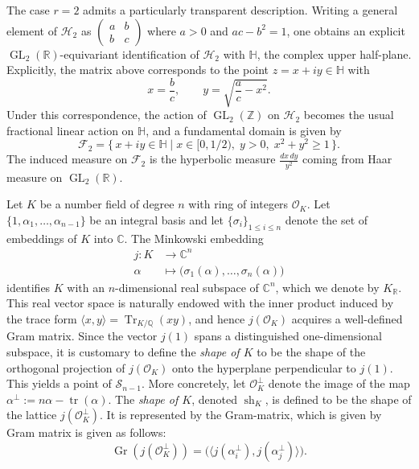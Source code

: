 \documentclass[table]{amsart}
\newcommand{\cO}{\mathcal{O}}
\newcommand{\op}[1]{\operatorname{#1}}
\numberwithin{equation}{section}
\begin{document}
\par The case $r=2$ admits a particularly transparent description. Writing a general element of $\mathcal{H}_2$ as $\begin{pmatrix} a & b \\ b & c \end{pmatrix}$ where $a>0$ and $ac-b^2=1$, one obtains an explicit $\op{GL}_2(\mathbb{R})$-equivariant identification of $\mathcal{H}_2$ with $\mathbb{H}$, the complex upper half-plane. Explicitly, the matrix above corresponds to the point $z=x+iy\in\mathbb{H}$ with
\[
x=\frac{b}{c}, \qquad y=\sqrt{\frac{a}{c}-x^2}.
\]
Under this correspondence, the action of $\op{GL}_2(\mathbb{Z})$ on $\mathcal{H}_2$ becomes the usual fractional linear action on $\mathbb{H}$, and a fundamental domain is given by
\[
\mathcal{F}_2=\{\, x+iy\in\mathbb{H} \mid x\in[0,1/2),\; y>0,\; x^2+y^2\ge 1 \,\}.
\]
The induced measure on $\mathcal{F}_2$ is the hyperbolic measure $\frac{dx\, dy}{y^2}$ coming from Haar measure on $\op{GL}_2(\mathbb{R})$.
\par Let $K$ be a number field of degree $n$ with ring of integers $\mathcal{O}_K$. Let $ \{1, \alpha_1, \dots, \alpha_{n-1}\} $ be an integral basis and let $ \{\sigma_i\}_{1 \leq i \leq n} $ denote the set of embeddings of $ K $ into $ \mathbb{C}$.  The Minkowski embedding  
\[
\begin{aligned}
    j: K &\to \mathbb{C}^{n} \\
    \alpha &\mapsto \big( \sigma_1(\alpha), \dots, \sigma_n(\alpha) \big)
\end{aligned}
\]
identifies $ K $ with an $ n $-dimensional real subspace of $ \mathbb{C}^n $, which we denote by $K_{\mathbb{R}}$. This real vector space is naturally endowed with the inner product induced by the trace form $\langle x,y\rangle=\op{Tr}_{K/\mathbb{Q}}(xy)$, and hence $j(\mathcal{O}_K)$ acquires a well-defined Gram matrix. Since the vector $j(1)$ spans a distinguished one-dimensional subspace, it is customary to define the \emph{shape of $K$} to be the shape of the orthogonal projection of $j(\mathcal{O}_K)$ onto the hyperplane perpendicular to $j(1)$. This yields a point of $\mathcal{S}_{n-1}$. More concretely, let $\cO_K^\perp$ denote the image of the map $\alpha^{\perp} := n\alpha - \operatorname{tr}(\alpha)$. The \emph{shape of $K$}, denoted $\op{sh}_K$, is defined to be the shape of the lattice $j(\cO_K^\perp)$. It is represented by the Gram-matrix, which is given by
Gram matrix is given as follows: 
\[\label{gram matrix computation}
\operatorname{Gr}\left(j\left(\mathcal{O}_{K}^{\perp}\right)\right) = \big( \langle j(\alpha_i^{\perp}), j(\alpha_j^{\perp}) \rangle \big).\]
\end{document}
